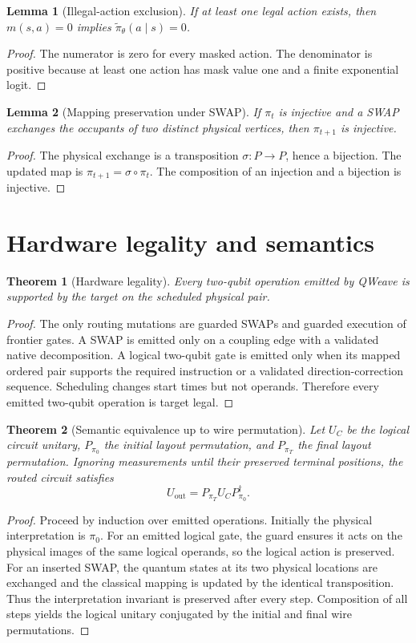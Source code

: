 \documentclass[11pt]{article}
\newtheorem{lemma}{Lemma}
\newtheorem{theorem}{Theorem}
\begin{document}
\begin{lemma}[Illegal-action exclusion]
If at least one legal action exists, then $m(s,a)=0$ implies $\widetilde\pi_\theta(a\mid s)=0$.
\end{lemma}
\begin{proof}
The numerator is zero for every masked action. The denominator is positive because at least one action has mask value one and a finite exponential logit.
\end{proof}

\begin{lemma}[Mapping preservation under SWAP]
If $\pi_t$ is injective and a SWAP exchanges the occupants of two distinct physical vertices, then $\pi_{t+1}$ is injective.
\end{lemma}
\begin{proof}
The physical exchange is a transposition $\sigma:P\to P$, hence a bijection. The updated map is $\pi_{t+1}=\sigma\circ\pi_t$. The composition of an injection and a bijection is injective.
\end{proof}

\section{Hardware legality and semantics}
\begin{theorem}[Hardware legality]
Every two-qubit operation emitted by QWeave is supported by the target on the scheduled physical pair.
\end{theorem}
\begin{proof}
The only routing mutations are guarded SWAPs and guarded execution of frontier gates. A SWAP is emitted only on a coupling edge with a validated native decomposition. A logical two-qubit gate is emitted only when its mapped ordered pair supports the required instruction or a validated direction-correction sequence. Scheduling changes start times but not operands. Therefore every emitted two-qubit operation is target legal.
\end{proof}

\begin{theorem}[Semantic equivalence up to wire permutation]
Let $U_C$ be the logical circuit unitary, $P_{\pi_0}$ the initial layout permutation, and $P_{\pi_T}$ the final layout permutation. Ignoring measurements until their preserved terminal positions, the routed circuit satisfies
\begin{equation}
U_{\mathrm{out}}=P_{\pi_T}U_CP_{\pi_0}^{\dagger}.
\end{equation}
\end{theorem}
\begin{proof}
Proceed by induction over emitted operations. Initially the physical interpretation is $\pi_0$. For an emitted logical gate, the guard ensures it acts on the physical images of the same logical operands, so the logical action is preserved. For an inserted SWAP, the quantum states at its two physical locations are exchanged and the classical mapping is updated by the identical transposition. Thus the interpretation invariant is preserved after every step. Composition of all steps yields the logical unitary conjugated by the initial and final wire permutations.
\end{proof}
\end{document}
